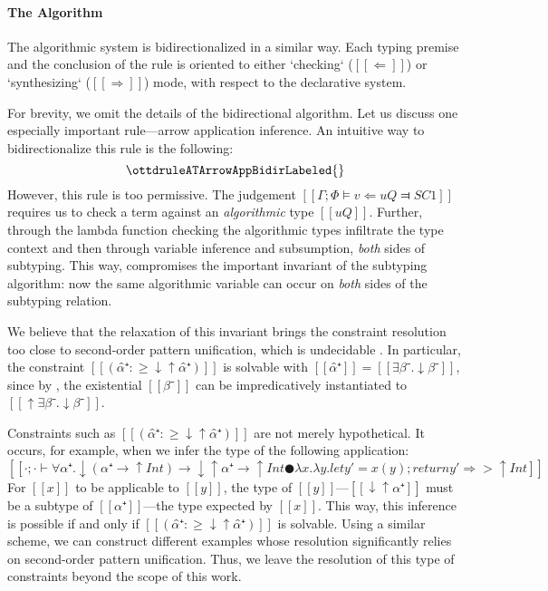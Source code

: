 \paragraph{The Algorithm}

    The algorithmic system is bidirectionalized in a similar way. 
    Each typing premise and the conclusion of the rule is oriented
    to either `checking` ($[[⇐]]$) or `synthesizing` ($[[⇒]]$) mode,
    with respect to the declarative system. 
 
    For brevity, we omit the details of the bidirectional algorithm.
    Let us discuss one especially important rule---arrow application inference. 
    An intuitive way to bidirectionalize this rule is the following:
    $$ \ottdruleATArrowAppBidirLabeled{} $$
    However, this rule is too permissive. 
    The judgement $[[Γ ; Φ ⊨ v ⇐ uQ ⫤ SC1]]$
    requires us to check a term against an \emph{algorithmic} 
    type $[[uQ]]$. Further, through the
    lambda function checking 
    the algorithmic types infiltrate the type context
    and then through variable inference and subsumption, 
    \emph{both} sides of subtyping. 
    This way, 
    compromises the important invariant
    of the subtyping algorithm: 
    now the same algorithmic variable can occur on \emph{both}
     sides of the subtyping relation.

    We believe that the relaxation of this invariant brings the 
    constraint resolution too close to second-order pattern 
    unification, which is undecidable \cite{goldfarb81:undecidability}.
    In particular, the constraint $[[(α̂⁺ :≥ ↓↑α̂⁺)]]$ is solvable with 
    $[[α̂⁺]] = [[∃β⁻.↓β⁻]]$, 
    since by , 
    the existential $[[β⁻]]$ can be impredicatively instantiated to $[[↑∃β⁻.↓β⁻]]$. 

    Constraints such as $[[(α̂⁺ :≥ ↓↑α̂⁺)]]$ are not merely hypothetical. 
    It occurs, for example, when we infer the type of the following application:
    $$[[· ; · ⊢ ∀α⁺ . ↓(α⁺ → ↑Int) → ↓↑α⁺ → ↑Int ● {λx.λy.let y' = x(y); return y'} ⇒> ↑Int]]$$
    For $[[x]]$ to be applicable to $[[y]]$,
    the type of $[[y]]$---$[[↓↑α⁺]]$ must be a subtype of
    $[[α⁺]]$---the type expected by $[[x]]$. This way, 
    this inference is possible if and only if
    $[[(α̂⁺ :≥ ↓↑α̂⁺)]]$ is solvable.
    Using a similar scheme, we can construct different examples
    whose resolution significantly relies on second-order pattern unification.
    Thus, we leave the resolution of this type of constraints beyond the scope of this work.

